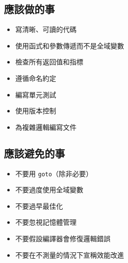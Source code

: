 \subsection*{應該做的事}

\begin{itemize}
\item 寫清晰、可讀的代碼
\item 使用函式和參數傳遞而不是全域變數
\item 檢查所有返回值和指標
\item 遵循命名約定
\item 編寫單元測試
\item 使用版本控制
\item 為複雜邏輯編寫文件
\end{itemize}

\subsection*{應該避免的事}

\begin{itemize}
\item 不要用 \texttt{goto}（除非必要）
\item 不要過度使用全域變數
\item 不要過早最佳化
\item 不要忽視記憶體管理
\item 不要假設編譯器會修復邏輯錯誤
\item 不要在不測量的情況下宣稱效能改進
\end{itemize}


